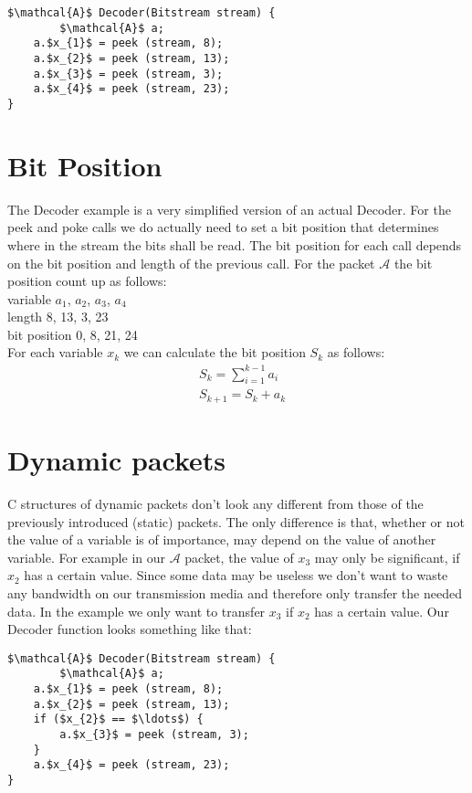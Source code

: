 \documentclass[parskip=half,paper=a4,DIV=13]{scrartcl}
\begin{document}
\begin{lstlisting}[mathescape]
$\mathcal{A}$ Decoder(Bitstream stream) {
        $\mathcal{A}$ a;
	a.$x_{1}$ = peek (stream, 8);
	a.$x_{2}$ = peek (stream, 13);
	a.$x_{3}$ = peek (stream, 3);
	a.$x_{4}$ = peek (stream, 23);
}
\end{lstlisting}

\section{Bit Position}

The Decoder example is a very simplified version of an actual Decoder.
For the peek and poke calls we do actually need to set a bit position
that determines where in the stream the bits shall be read.
The bit position for each call depends on the bit position and length of the previous call.
For the packet $\mathcal{A}$ the bit position count up as follows:\\
variable   $a_{1}$, $a_{2}$, $a_{3}$, $a_{4}$\\
length      8, 13,  3, 23\\
bit position      0,  8, 21, 24\\
For each variable $x_{k}$ we can calculate the bit position $S_{k}$ as follows:
\begin{align*}
	&S_{k} = \sum_{i=1}^{k-1} a_{i}\\
	&S_{k+1} = S_{k} + a_{k}
\end{align*}

\section{Dynamic packets}

C structures of dynamic packets don't look any different from those of the previously introduced (static) packets.
The only difference is that, whether or not the value of a variable is of importance, may depend on the value of another variable.	
For example in our $\mathcal{A}$ packet, the value of $x_{3}$ may only be significant, if $x_{2}$ has a certain value.
Since some data may be useless we don't want to waste any bandwidth on our transmission media and therefore only transfer the needed data.
In the example we only want to transfer $x_{3}$ if $x_{2}$ has a certain value.
Our Decoder function looks something like that:

\begin{lstlisting}[mathescape]
$\mathcal{A}$ Decoder(Bitstream stream) {
        $\mathcal{A}$ a;
	a.$x_{1}$ = peek (stream, 8);
	a.$x_{2}$ = peek (stream, 13);
	if ($x_{2}$ == $\ldots$) {
		a.$x_{3}$ = peek (stream, 3);
	}
	a.$x_{4}$ = peek (stream, 23);
}
\end{lstlisting}
\end{document}
